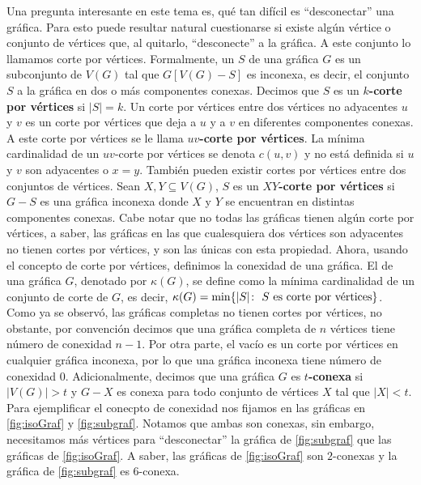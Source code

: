 Una pregunta interesante en este tema es, qu\'e tan dif\'icil es ``desconectar''
una gr\'afica. Para esto puede resultar natural cuestionarse si existe alg\'un
v\'ertice o conjunto de v\'ertices que, al quitarlo, ``desconecte'' a la
gr\'afica. A este conjunto lo llamamos corte por v\'ertices. Formalmente, un
 $S$ de una gr\'afica $G$
es un subconjunto de $V(G)$ tal que $G[V(G)-S]$ es inconexa, es decir, el
conjunto $S$  a la gr\'afica en dos o m\'as componentes conexas.
Decimos que $S$ es un $k$\textbf{-corte por v\'ertices} si $|S|=k$. Un corte
por v\'ertices entre dos v\'ertices no adyacentes $u$ y $v$ es un corte por
v\'ertices que deja a $u$ y a $v$ en diferentes componentes conexas. A este
corte por v\'ertices se le llama $uv$\textbf{-corte por v\'ertices}. La m\'inima
cardinalidad de un $uv$-corte por v\'ertices se denota $c(u,v)$ y no est\'a
definida si $u$ y $v$ son adyacentes o $x=y$. Tambi\'en pueden existir cortes
por v\'ertices entre dos conjuntos de v\'ertices. Sean $X,Y \subseteq V(G)$, $S$
es un $XY$\textbf{-corte por v\'ertices} si $G-S$ es una gr\'afica inconexa
donde $X$ y $Y$ se encuentran en distintas componentes conexas. Cabe notar que
no todas las gr\'aficas tienen alg\'un corte por v\'ertices, a saber, las
gr\'aficas en las que cualesquiera dos v\'ertices son adyacentes no tienen
cortes por v\'ertices, y son las \'unicas con esta propiedad. Ahora, usando el
concepto de corte por v\'ertices, definimos la conexidad de una gr\'afica. El
 de una gr\'afica $G$, denotado por $\kappa(G)$,
se define como la m\'inima cardinalidad de un conjunto de corte de $G$, es
decir, $\kappa(G)=\min \{|S| \colon\ S \textnormal{ es corte por v\'ertices}\}$.
Como ya se observ\'o, las gr\'aficas completas no tienen cortes por v\'ertices,
no obstante, por convenci\'on decimos que una gr\'afica completa de $n$
v\'ertices tiene n\'umero de conexidad $n-1$. Por otra parte, el vac\'io es un
corte por v\'ertices en cualquier gr\'afica inconexa, por lo que una gr\'afica
inconexa tiene n\'umero de conexidad $0$. Adicionalmente, decimos que una
gr\'afica $G$ es $t$\textbf{-conexa}  si
$|V(G)|>t$ y $G-X$ es conexa para todo conjunto de v\'ertices $X$ tal que
$|X|<t$. Para ejemplificar el conecpto de conexidad nos fijamos en las
gr\'aficas en \cref{fig:isoGraf} y \cref{fig:subgraf}. Notamos que ambas son
conexas, sin embargo, necesitamos m\'as v\'ertices para ``desconectar'' la
gr\'afica de \cref{fig:subgraf} que las gr\'aficas de \cref{fig:isoGraf}. A
saber, las gr\'aficas de \cref{fig:isoGraf} son $2$-conexas y la gr\'afica de
\cref{fig:subgraf} es $6$-conexa.

